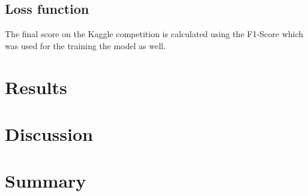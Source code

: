 \documentclass[10pt,conference,compsocconf]{IEEEtran}
\begin{document}
\subsection{Loss function}

The final score on the Kaggle competition \cite{KaggleCompetition} is calculated using the F1-Score which was used for the training the model as well.

\section{Results}

\section{Discussion}

\section{Summary}




\end{document}
